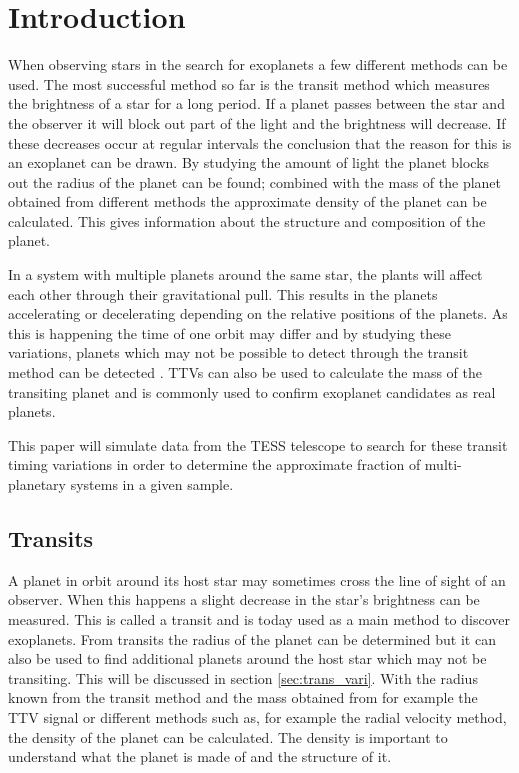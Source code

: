 \documentclass[12pt]{report}
\begin{document}
\newpage

\setcounter{page}{1} %

\tableofcontents

\newpage

\listoffigures 

\newpage

\chapter{Introduction}
When observing stars in the search for exoplanets a few different methods can be used. The most successful method so far is the transit method which measures the brightness of a star for a long period. If a planet passes between the star and the observer it will block out part of the light and the brightness will decrease. If these decreases occur at regular intervals the conclusion that the reason for this is an exoplanet can be drawn. By studying the amount of light the planet blocks out the radius of the planet can be found; combined with the mass of the planet obtained from different methods the approximate density of the planet can be calculated. This gives information about the structure and composition of the planet.

In a system with multiple planets around the same star, the plants will affect each other through their gravitational pull. This results in the planets accelerating or decelerating depending on the relative positions of the planets. As this is happening the time of one orbit may differ and by studying these variations, planets which may not be possible to detect through the transit method can be detected \citep{2012Sci...336.1133N}. TTVs can also be used to calculate the mass of the transiting planet and is commonly used to confirm exoplanet candidates as real planets.

This paper will simulate data from the TESS telescope to search for these transit timing variations in order to determine the approximate fraction of multi-planetary systems in a given sample.

\section{Transits}
	A planet in orbit around its host star may sometimes cross the line of sight of an observer. When this happens a slight decrease in the star's brightness can be measured. This is called a transit and is today used as a main method to discover exoplanets. From transits the radius of the planet can be determined but it can also be used to find additional planets around the host star which may not be transiting. This will be discussed in section \ref{sec:trans_vari}. With the radius known from the transit method and the mass obtained from for example the TTV signal or different methods such as, for example the radial velocity method, the density of the planet can be calculated. The density is important to understand what the planet is made of and the structure of it.
\end{document}

